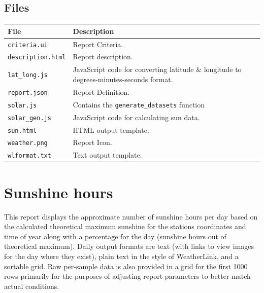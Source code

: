 \documentclass[a4paper,10pt]{book}
\begin{document}
\subsection{Files}
\begin{tabular}{p{3.8cm} p{10cm}}
\hline
\textbf{File} & \textbf{Description} \\
\hline
\verb|criteria.ui| & Report Criteria.\\
\verb|description.html| & Report description. \\
\verb|lat_long.js| & JavaScript code for converting latitude \& longitude to degrees-minutes-seconds format.\\
\verb|report.json| & Report Definition.\\
\verb|solar.js| & Contains the \verb|generate_datasets| function\\
\verb|solar_gen.js| & JavaScript code for calculating sun data.\\
\verb|sun.html| & HTML output template.\\
\verb|weather.png| & Report Icon.\\
\verb|wlformat.txt| & Text output template.\\
\hline
\end{tabular}

\section{Sunshine hours}
This report displays the approximate number of sunshine hours per day based on the calculated theoretical maximum sunshine for the stations coordinates and time of year along with a percentage for the day (sunshine hours out of theoretical maximum). Daily output formats are text (with links to view images for the day where they exist), plain text in the style of WeatherLink, and a sortable grid. Raw per-sample data is also provided in a grid for the first 1000 rows primarily for the purposes of adjusting report parameters to better match actual conditions.
\end{document}
